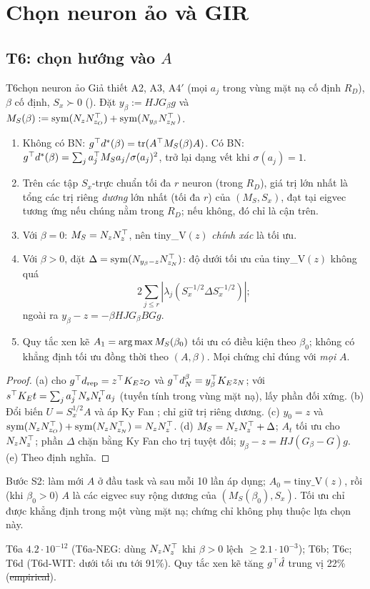 \section{Chọn neuron ảo và GIR}\label{sec:select}

\subsection{T6: chọn hướng vào $A$}

\begin{namedthm}{T6}{chọn neuron ảo}
Giả thiết A2, A3, A4$'$ (mọi $a_j$ trong vùng mặt nạ cố định $R_D$), $\beta$ cố định, $S_x\succ0$ (). Đặt $y_\beta:=HJG_\beta g$ và $M_S(\beta):=\operatorname{sym}(N_zN_{z_O}^{\top})+\operatorname{sym}(N_{y_\beta}N_{z_N}^{\top})$.
\begin{enumerate}[label=(\alph*)]
\item Không có BN: $g^{\top} d^*(\beta)=\operatorname{tr}(A^{\top} M_S(\beta)A)$. Có BN: $g^{\top} d^*(\beta)=\sum_ja_j^{\top} M_Sa_j/\sigma(a_j)^2$, trở lại dạng vết khi $\sigma(a_j)=1$.
\item Trên các tập $S_x$-trực chuẩn tối đa $r$ neuron (trong $R_D$), giá trị lớn nhất là tổng các trị riêng \emph{dương} lớn nhất (tối đa $r$) của $(M_S,S_x)$, đạt tại eigvec tương ứng nếu chúng nằm trong $R_D$; nếu không, đó chỉ là cận trên.
\item Với $\beta=0$: $M_S=N_zN_z^{\top}$, nên tiny\_V$(z)$ \emph{chính xác} là tối ưu.
\item Với $\beta>0$, đặt $\Delta=\operatorname{sym}(N_{y_\beta-z}N_{z_N}^{\top})$: độ dưới tối ưu của tiny\_V$(z)$ không quá
\[2\textstyle\sum_{j\le r}|\lambda_j(S_x^{-1/2}\Delta S_x^{-1/2})|;\]
ngoài ra $y_\beta-z=-\beta HJG_\beta BGg$.
\item Quy tắc xen kẽ $A_1=\operatorname*{arg\,max} M_S(\beta_0)$ tối ưu có điều kiện theo $\beta_0$; không có khẳng định tối ưu đồng thời theo $(A,\beta)$. Mọi chứng chỉ đúng với \emph{mọi} $A$.
\end{enumerate}
\end{namedthm}
\begin{proof}
(a)  cho $g^{\top}d_{\mathrm{rep}}=z^{\top} K_Ez_O$ và $g^{\top}d_N^{\beta}=y_\beta^{\top} K_Ez_N$; với $s^{\top} K_Et=\sum_ja_j^{\top} N_sN_t^{\top} a_j$ (tuyến tính trong vùng mặt nạ), lấy phần đối xứng. (b) Đổi biến $U=S_x^{1/2}A$ và áp Ky Fan \cite{fan1949}; chỉ giữ trị riêng dương. (c) $y_0=z$ và $\operatorname{sym}(N_zN_{z_O}^{\top})+\operatorname{sym}(N_zN_{z_N}^{\top})=N_zN_z^{\top}$. (d) $M_S=N_zN_z^{\top}+\Delta$; $A_t$ tối ưu cho $N_zN_z^{\top}$; phần $\Delta$ chặn bằng Ky Fan cho trị tuyệt đối; $y_\beta-z=HJ(G_\beta-G)g$. (e) Theo định nghĩa.
\end{proof}
\begin{hequa}
Bước S2: làm mới $A$ ở đầu task và sau mỗi 10 lần áp dụng; $A_0=\text{tiny\_V}(z)$, rồi (khi $\beta_0>0$) $A$ là các eigvec suy rộng dương của $(M_S(\beta_0),S_x)$. Tối ưu chỉ được khẳng định trong một vùng mặt nạ; chứng chỉ không phụ thuộc lựa chọn này.
\end{hequa}
\begin{kiem}
T6a $4.2\cdot10^{-12}$ (T6a-NEG: dùng $N_zN_z^{\top}$ khi $\beta>0$ lệch $\ge2.1\cdot10^{-3}$); T6b; T6c; T6d (T6d-WIT: dưới tối ưu tới 91\%). Quy tắc xen kẽ tăng $g^{\top}\hat d$ trung vị 22\% (\st{empirical}).
\end{kiem}

